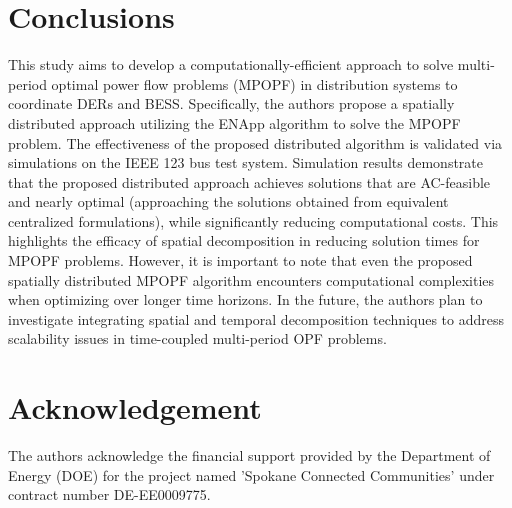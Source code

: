 \documentclass{article}
\begin{document}
\section{Conclusions}
This study aims to develop a computationally-efficient approach to solve multi-period optimal power flow problems (MPOPF) in distribution systems to coordinate DERs and BESS. Specifically, the authors propose a spatially distributed approach utilizing the ENApp algorithm to solve the MPOPF problem. The effectiveness of the proposed distributed algorithm is validated via simulations on the IEEE 123 bus test system. Simulation results demonstrate that the proposed distributed approach achieves solutions that are AC-feasible and nearly optimal (approaching the solutions obtained from equivalent centralized formulations), while significantly reducing computational costs. This highlights the efficacy of spatial decomposition in reducing solution times for MPOPF problems. However, it is important to note that even the proposed spatially distributed MPOPF algorithm encounters computational complexities when optimizing over longer time horizons. In the future, the authors plan to investigate integrating spatial and temporal decomposition techniques to address scalability issues in time-coupled multi-period OPF problems.


\section{Acknowledgement}
The authors acknowledge the financial support provided by the Department of Energy (DOE)  for the project named 'Spokane Connected Communities' under contract number DE-EE0009775. 
\end{document}
